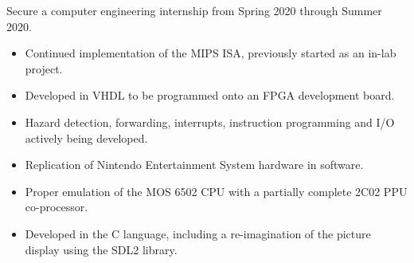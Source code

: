 Secure a computer engineering internship from Spring 2020 through Summer 2020.

\begin{itemize}
\item Continued implementation of the MIPS ISA, previously started as an in-lab project.
\item Developed in VHDL to be programmed onto an FPGA development board.
\item Hazard detection, forwarding, interrupts, instruction programming and I/O actively being developed.
\end{itemize}

\begin{itemize}
\item Replication of Nintendo Entertainment System hardware in software.
\item Proper emulation of the MOS 6502 CPU with a partially complete 2C02 PPU co-processor.
\item Developed in the C language, including a re-imagination of the picture display using the SDL2 library.
\end{itemize}


